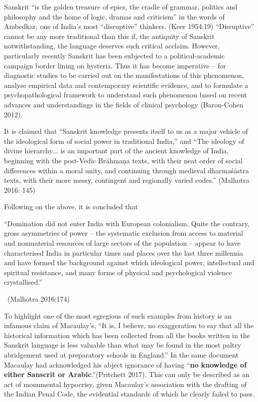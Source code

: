 Sanskrit “is the golden treasure of epics, the cradle of grammar, politics and philosophy and the home of logic, dramas and criticism” in the words of Ambedkar, one of India’s most “disruptive” thinkers. (Keer 1954:19) “Disruptive” cannot be any more traditional than this if, the antiquity of Sanskrit notwithstanding, the language deserves such critical acclaim. However, particularly recently Sanskrit has been subjected to a political-academic campaign border lining on hysteria. Thus it has become imperative – for diagnostic studies to be carried out on the manifestations of this phenomenon, analyse empirical data and contemporary scientific evidence, and to formulate a psychopathological framework to understand such phenomenon based on recent advances and understandings in the fields of clinical psychology (Baron-Cohen 2012).

It is claimed that “Sanskrit knowledge presents itself to us as a major vehicle of the ideological form of social power in traditional India,” and “The ideology of divine hierarchy... is an important part of the ancient knowledge of India, beginning with the post-Vedic Brāhmaṇa texts, with their neat order of social differences within a moral unity, and continuing through medieval dharmaśāstra texts, with their more messy, contingent and regionally varied codes.” (Malhotra 2016: 145)

Following on the above, it is concluded that

\begin{myquote}
“Domination did not enter India with European colonialism. Quite the contrary, gross asymmetries of power – the systematic exclusion from access to material and nonmaterial resources of large sectors of the population – appear to have characterised India in particular times and places over the last three millennia and have formed the background against which ideological power, intellectual and spiritual resistance, and many forms of physical and psychological violence crystallised.” 

~\hfill (Malhotra 2016:174)
\end{myquote}

To highlight one of the most egregious of such examples from history is an infamous claim of Macaulay’s, “It is, I believe, no exaggeration to say that all the historical information which has been collected from all the books written in the Sanskrit language is less valuable than what may be found in the most paltry abridgement used at preparatory schools in England.” In the same document Macaulay had acknowledged his abject ignorance of having “\textbf{no knowledge of either Sanscrit or Arabic}.”(Pritchett 2017). This can only be described as an act of monumental hypocrisy, given Macaulay's association with the drafting of the Indian Penal Code, the evidential standards of which he clearly failed to pass.


